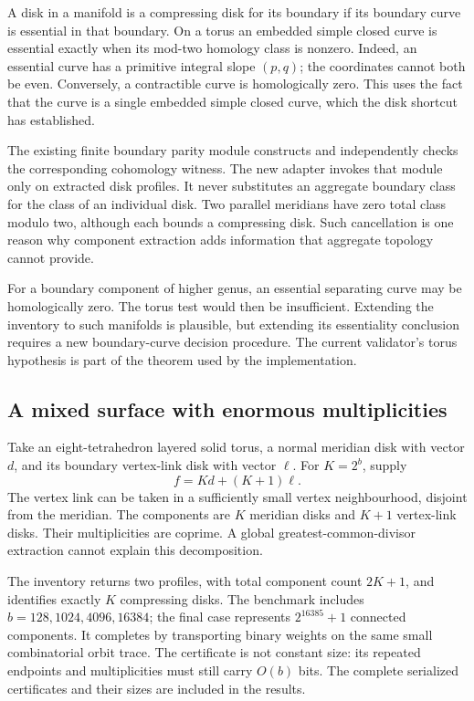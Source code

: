 \documentclass[11pt,a4paper]{article}
\theoremstyle{definition}
\theoremstyle{remark}
\begin{document}
A disk in a manifold is a compressing disk for its boundary if its boundary
curve is essential in that boundary. On a torus an embedded simple closed
curve is essential exactly when its mod-two homology class is nonzero.
Indeed, an essential curve has a primitive integral slope $(p,q)$; the
coordinates cannot both be even. Conversely, a contractible curve is
homologically zero. This uses the fact that the curve is a single embedded
simple closed curve, which the disk shortcut has established.

The existing finite boundary parity module constructs and independently
checks the corresponding cohomology witness. The new adapter invokes
that module only on extracted disk profiles. It never substitutes an
aggregate boundary class for the class of an individual disk. Two parallel
meridians have zero total class modulo two, although each bounds a
compressing disk. Such cancellation is one reason why component extraction
adds information that aggregate topology cannot provide.

For a boundary component of higher genus, an essential separating curve
may be homologically zero. The torus test would then be insufficient.
Extending the inventory to such manifolds is plausible, but extending its
essentiality conclusion requires a new boundary-curve decision procedure.
The current validator's torus hypothesis is part of the theorem used by
the implementation.

\subsection{A mixed surface with enormous multiplicities}

Take an eight-tetrahedron layered solid torus, a normal meridian disk with
vector $d$, and its boundary vertex-link disk with vector $\ell$. For
$K=2^b$, supply
\begin{equation}\label{eq:capacity-surface}
                 f=K d+(K+1)\ell.
\end{equation}
The vertex link can be taken in a sufficiently small vertex neighbourhood,
disjoint from the meridian. The components are $K$ meridian disks and
$K+1$ vertex-link disks. Their multiplicities are coprime. A global
greatest-common-divisor extraction cannot explain this decomposition.

The inventory returns two profiles, with total component count $2K+1$,
and identifies exactly $K$ compressing disks. The benchmark includes
$b=128,1024,4096,16384$; the final case represents
$2^{16385}+1$ connected components. It completes by transporting binary
weights on the same small combinatorial orbit trace. The certificate is
not constant size: its repeated endpoints and multiplicities must still
carry $O(b)$ bits. The complete serialized certificates and their sizes
are included in the results.
\end{document}
